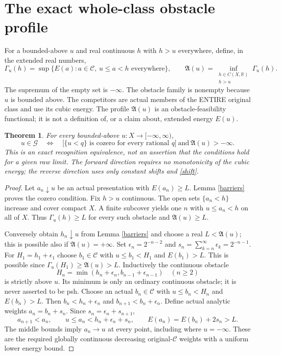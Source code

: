 \documentclass[11pt]{article}
\newtheorem{theorem}{Theorem}
\newcommand{\C}{\mathcal C}
\newcommand{\G}{\mathcal G}
\newcommand{\A}{\mathfrak A}
\begin{document}
\section*{The exact whole-class obstacle profile}
For a bounded-above $u$ and real continuous $h$ with $h>u$ everywhere,
define, in the extended real numbers,
\[
 \Gamma_u(h)=\sup\{E(a):a\in\C,\ u\le a<h\text{ everywhere}\},
 \qquad
 \A(u)=\inf_{\substack{h\in C(X,\mathbb R)\\h>u}}\Gamma_u(h).
\]
The supremum of the empty set is $-\infty$. The obstacle family is
nonempty because $u$ is bounded above. The competitors are actual
members of the ENTIRE original class and use its cubic energy.
The profile $\A(u)$ is an obstacle-feasibility functional; it is not
a definition of, or a claim about, extended energy $E(u)$.

\begin{theorem}\label{recognition}
For every bounded-above $u:X\to[-\infty,\infty)$,
\[
 u\in\G\quad\Longleftrightarrow\quad
 \bigl[\{u<q\}\text{ is cozero for every rational }q\bigr]
 \ \text{and}\ \A(u)>-\infty.
\]
This is an exact recognition equivalence, not an assertion that the
conditions hold for a given raw limit. The forward direction requires
no monotonicity of the cubic energy; the reverse direction uses only
constant shifts and \eqref{shift}.
\end{theorem}
\begin{proof}
Let $a_n\downarrow u$ be an actual presentation with $E(a_n)\ge L$.
Lemma \ref{barriers} proves the cozero condition. Fix $h>u$ continuous.
The open sets $\{a_n<h\}$ increase and cover compact $X$. A finite
subcover yields one $n$ with $u\le a_n<h$ on all of $X$. Thus
$\Gamma_u(h)\ge L$ for every such obstacle and $\A(u)\ge L$.

Conversely obtain $h_n\downarrow u$ from Lemma \ref{barriers} and
choose a real $L<\A(u)$; this is possible also if $\A(u)=+\infty$.
Set $\epsilon_n=2^{-n-2}$ and
$s_n=\sum_{k=n}^{\infty}\epsilon_k=2^{-n-1}$.
For $H_1=h_1+\epsilon_1$ choose $b_1\in\C$ with
$u\le b_1<H_1$ and $E(b_1)>L$. This is possible since
$\Gamma_u(H_1)\ge\A(u)>L$.
Inductively the continuous obstacle
\[
 H_n=\min(h_n+\epsilon_n,b_{n-1}+\epsilon_{n-1})\quad(n\ge2)
\]
is strictly above $u$. Its minimum is only an ordinary continuous
obstacle; it is never asserted to be psh. Choose an actual $b_n\in\C$
with $u\le b_n<H_n$ and $E(b_n)>L$.
Then $b_n<h_n+\epsilon_n$ and
$b_{n+1}<b_n+\epsilon_n$. Define actual analytic weights
$a_n=b_n+s_n$. Since $s_n=\epsilon_n+s_{n+1}$,
\[
 a_{n+1}<a_n,\qquad
 u\le a_n<h_n+\epsilon_n+s_n,\qquad
 E(a_n)=E(b_n)+2s_n>L.
\]
The middle bounds imply $a_n\to u$ at every point, including where
$u=-\infty$. These are the required globally continuous decreasing
original-$\C$ weights with a uniform lower energy bound.
\end{proof}
\end{document}
